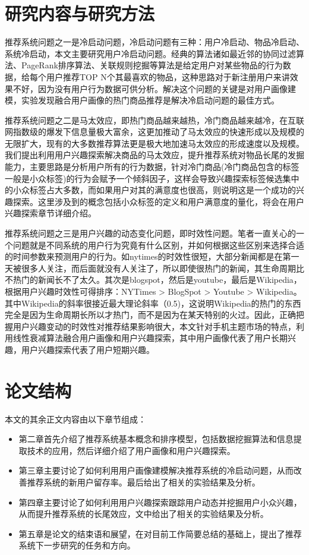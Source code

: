 \section{研究内容与研究方法}
	推荐系统问题之一是冷启动问题，冷启动问题有三种：用户冷启动、物品冷启动、系统冷启动，本文主要研究用户冷启动问题。经典的算法诸如最近邻的协同过滤算法、PageRank排序算法、关联规则挖掘等算法是给定用户对某些物品的行为数据，给每个用户推荐TOP N个其最喜欢的物品，这种思路对于新注册用户来讲效果不好，因为没有用户行为数据可供分析。解决这个问题的关键是对用户画像建模，实验发现融合用户画像的热门商品推荐是解决冷启动问题的最佳方式。

	推荐系统问题之二是马太效应，即热门商品越来越热，冷门商品越来越冷，在互联网指数级的爆发下信息量极大富余，这更加推动了马太效应的快速形成以及规模的无限扩大，现有的大多数推荐算法更是极大地加速马太效应的形成速度以及规模。我们提出利用用户兴趣探索解决商品的马太效应，提升推荐系统对物品长尾的发掘能力，主要思路是分析用户所有的行为数据，针对冷门商品(冷门商品包含的标签一般是小众标签)的行为会赋予一个倾斜因子，这样会导致兴趣探索标签候选集中的小众标签占大多数，而如果用户对其的满意度也很高，则说明这是一个成功的兴趣探索。这里涉及到的概念包括小众标签的定义和用户满意度的量化，将会在用户兴趣探索章节详细介绍。

	推荐系统问题之三是用户兴趣的动态变化问题，即时效性问题。笔者一直关心的一个问题就是不同系统的用户行为究竟有什么区别，并如何根据这些区别来选择合适的时间参数来预测用户的行为。如nytimes的时效性很短，大部分新闻都是在第一天被很多人关注，而后面就没有人关注了，所以即使很热门的新闻，其生命周期比不热门的新闻长不了太久。其次是blogspot，然后是youtube，最后是Wikipedia，根据用户兴趣时效性可得排序：NYTimes > BlogSpot > Youtube > Wikipedia。其中Wikipedia的斜率很接近最大理论斜率（0.5)，这说明Wikipedia的热门的东西完全是因为生命周期长所以才热门，而不是因为在某天特别的火过。因此，正确把握用户兴趣变动的时效性对推荐结果影响很大，本文针对手机主题市场的特点，利用线性衰减算法融合用户画像和用户兴趣探索，其中用户画像代表了用户长期兴趣，用户兴趣探索代表了用户短期兴趣。

\section{论文结构}
	本文的其余正文内容由以下章节组成：
	\begin{itemize}
		\item 第二章首先介绍了推荐系统基本概念和排序模型，包括数据挖掘算法\citep{date-mining}和信息提取技术\citep{info-retrieval}的应用，然后详细介绍了用户画像和用户兴趣探索。
		\item 第三章主要讨论了如何利用用户画像建模解决推荐系统的冷启动问题，从而改善推荐系统的新用户留存率。最后给出了相关的实验结果及分析。
		\item 第四章主要讨论了如何利用用户兴趣探索跟踪用户动态并挖掘用户小众兴趣，从而提升推荐系统的长尾效应\citep{long-tail}，文中给出了相关的实验结果及分析。
		\item 第五章是论文的结束语和展望，在对目前工作简要总结的基础上，提出了推荐系统下一步研究的任务和方向。
	\end{itemize}